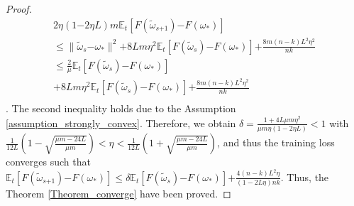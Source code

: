\documentclass[letterpaper]{article}
\begin{document}
\begin{proof}
\begin{equation}
\begin{array}{ll}
2\eta(1\mathrm{-}2\eta L)m \mathbb{E}_t [F(\tilde{\omega}_{s\mathrm{+}1}) \mathrm{-} F(\omega_\ast) ] \\
\le  \parallel  \tilde{\omega}_{s}\mathrm{-}\omega_\ast  \parallel^2 \mathrm{+} 8L m \eta^2 \mathbb{E}_t[F(\tilde{\omega}_s)\mathrm{-}F(\omega_\ast)] \mathrm{+} \frac{8m(n-k)L^2\eta^2}{nk} \\ 
\le \frac{2}{\mu}\mathbb{E}_t[ F(\tilde{\omega}_{s}) \mathrm{-}  F(\omega_\ast)  ]\\
 \mathrm{+} 8L m \eta^2 \mathbb{E}_t[F(\tilde{\omega}_s)\mathrm{-}F(\omega_\ast)] \mathrm{+} \frac{8m(n-k)L^2\eta^2}{nk} \\
\end{array} 
\end{equation}. The second inequality holds due to the Assumption \ref{assumption_strongly_convex}. Therefore, we obtain $\delta=\frac{1+4L\mu m \eta^2}{  \mu m \eta (1-2\eta L)  } < 1$ with $\frac{1}{12L}\left( 1- \sqrt{\frac{\mu m - 24L}{\mu m}} \right) < \eta < \frac{1}{12L}\left( 1+ \sqrt{\frac{\mu m - 24L}{\mu m}} \right)$, and thus the training loss converges such that
$\mathbb{E}_t[F(\tilde{\omega}_{s\mathrm{+}1}) \mathrm{-} F(\omega_\ast)]  \le \delta \mathbb{E}_t[F(\tilde{\omega}_s)\mathrm{-}F(\omega_\ast)] \mathrm{+} \frac{4(n-k)L^2\eta}{(1-2L\eta)nk}$.  Thus, the Theorem \ref{Theorem_converge} have been proved.
\end{proof}
\end{document}
